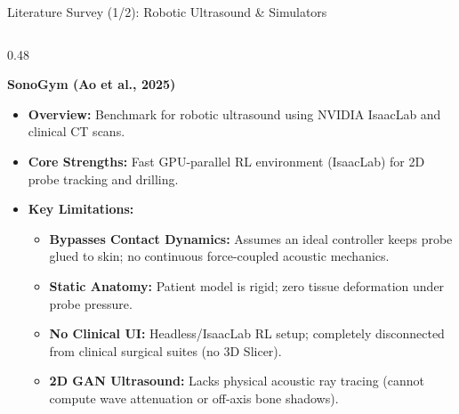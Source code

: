 \documentclass[aspectratio=169, 10pt]{beamer}
\begin{document}
\begin{frame}{Literature Survey (1/2): Robotic Ultrasound \& Simulators}
    \begin{columns}[T]
        \begin{column}{0.48\textwidth}
            \begin{block}{\textbf{SonoGym (Ao et al., 2025)}}
                \begin{itemize}\itemsep=3pt
                    \item \textbf{Overview:} Benchmark for robotic ultrasound using NVIDIA IsaacLab and clinical CT scans.
                    \item \textbf{Core Strengths:} Fast GPU-parallel RL environment (IsaacLab) for 2D probe tracking and drilling.
                    \item \textcolor{accentorange}{\textbf{Key Limitations:}}
                    \begin{itemize}\itemsep=2pt
                        \item \textbf{Bypasses Contact Dynamics:} Assumes an ideal controller keeps probe glued to skin; no continuous force-coupled acoustic mechanics.
                        \item \textbf{Static Anatomy:} Patient model is rigid; zero tissue deformation under probe pressure.
                        \item \textbf{No Clinical UI:} Headless/IsaacLab RL setup; completely disconnected from clinical surgical suites (no 3D Slicer).
                        \item \textbf{2D GAN Ultrasound:} Lacks physical acoustic ray tracing (cannot compute wave attenuation or off-axis bone shadows).
                    \end{itemize}
                \end{itemize}
            \end{block}
        \end{column}


\end{columns}
\end{frame}
\end{document}
